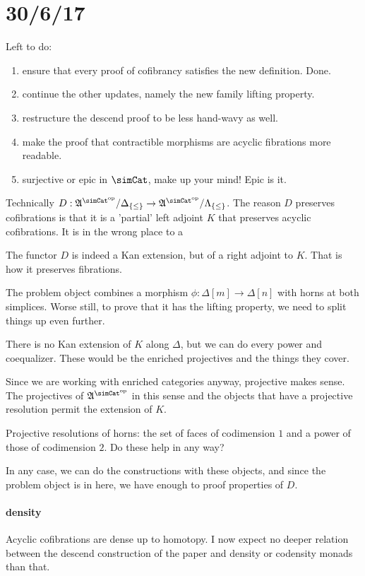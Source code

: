 \documentclass{tac}
\newcommand\set[1]{\left\{#1\right\}}
\newcommand\dual{^{\mathrm{op}}}
\newcommand\s{^{\simCat\dual}}
\newcommand\of{:}
\newcommand\simplex\Delta
\newcommand\horn\Lambda
\newcommand\ambient{\mathfrak A}
\begin{document}
\section{30/6/17}
Left to do:
\begin{enumerate}
\item ensure that every proof of cofibrancy satisfies the new definition.
Done.

\item continue the other updates, namely the new family lifting property.
\item restructure the descend proof to be less hand-wavy as well.

\item make the proof that contractible morphisms are acyclic fibrations more readable.
\item surjective or epic in $\simCat$, make up your mind!
Epic is it.
\end{enumerate}


Technically $D\of \ambient\s/\simplex_{\set\leq} \to \ambient\s/\horn_{\set\leq}$.
The reason $D$ preserves cofibrations is that it is a 'partial' left adjoint $K$ that preserves acyclic cofibrations. It is in the wrong place to a 

The functor $D$ is indeed a Kan extension, but of a right adjoint to $K$.
That is how it preserves fibrations.

The problem object combines a morphism $\phi\of\simplex[m]\to\simplex[n]$ with horns at both simplices. Worse still, to prove that it has the lifting property, we need to split things up even further.

There is no Kan extension of $K$ along $\Delta$, but we can do every power and coequalizer.
These would be the enriched projectives and the things they cover.

Since we are working with enriched categories anyway, projective makes sense. The projectives of $\ambient\s$ in this sense and the objects that have a projective resolution permit the extension of $K$.

Projective resolutions of horns: the set of faces of codimension $1$ and a power of those of codimension $2$. Do these help in any way?

In any case, we can do the constructions with these objects,
and since the problem object is in here, we have enough to proof properties of $D$.

\paragraph{density}
Acyclic cofibrations are dense up to homotopy. I now expect no deeper relation between the descend construction of the paper and density or codensity monads than that.
\end{document}
